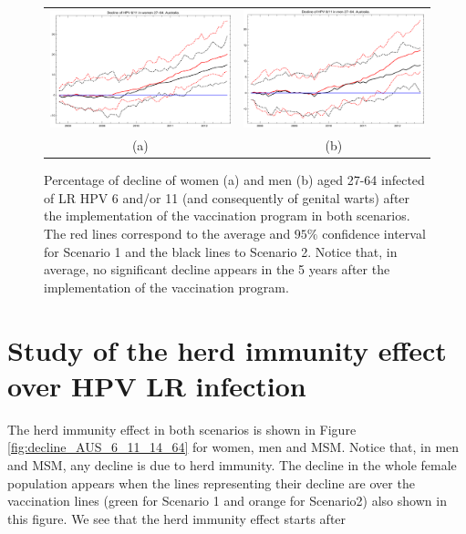 \begin{figure}[!]
	\centering
	\begin{tabular}{cc}
		\includegraphics[width=0.5\linewidth]{IMGs/3.-Australia/Decl_muj_27_64_verr_Australia.pdf}	& 
		\includegraphics[width=0.5\linewidth]{IMGs/3.-Australia/Decl_hom_27_64_verr_Australia.pdf}  \\ 
		(a)	& (b) 
	\end{tabular} 
	\caption{Percentage of decline of women (a) and men (b) aged 27-64 infected of LR HPV 6 and/or 11 (and consequently of genital warts) after the implementation of the vaccination program in both scenarios. The red lines correspond to the average and $95\%$ confidence interval for Scenario 1 and the black lines to Scenario 2. Notice that, in average, no significant decline appears in the 5 years after the implementation of the vaccination program.}
	\label{fig:decline_AUS_6_11_27_64}
\end{figure}

\section{Study of the herd immunity effect over HPV LR infection}
The herd immunity effect in both scenarios is shown in Figure \ref{fig:decline_AUS_6_11_14_64} for women, men and MSM. Notice that, in men and MSM, any decline is due to herd immunity. The decline in the whole female population appears when the lines representing their decline are over the vaccination lines (green for Scenario 1 and orange for Scenario2) also shown in this figure. We see that the herd immunity effect starts after 

